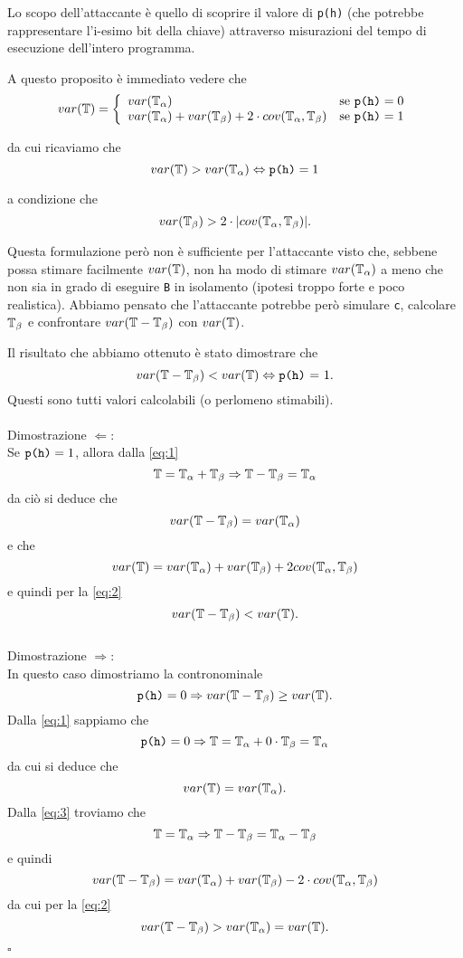 	Lo scopo dell'attaccante è quello di scoprire il valore di \texttt{p(h)} (che potrebbe rappresentare l'i-esimo bit della chiave) attraverso misurazioni del tempo di esecuzione dell'intero programma.
	
	A questo proposito è immediato vedere che $$var(\mathbb{T})=\left\{\begin{array}{ll}
	var(\mathbb{T}_{\alpha}) & \mathrm{s}\mathrm{e}\ \text{\texttt{p(h)}} = 0\\
	var(\mathbb{T}_{\alpha})+var(\mathbb{T}_{\beta})+2\cdot cov (\mathbb{T}_{\alpha},\mathbb{T}_{\beta}) & \mathrm{s}\mathrm{e}\ \text{\texttt{p(h)}} = 1
	\end{array}\right.$$ 
	
	da cui ricaviamo che $$var(\mathbb{T}) > var(\mathbb{T}_{\alpha}) \Leftrightarrow \text{\texttt{p(h)}} = 1$$ 
	
	a condizione che 
	\begin{equation} \label{eq:2}
		var(\mathbb{T}_{\beta}) > 2 \cdot |cov(\mathbb{T}_{\alpha},\mathbb{T}_{\beta})|.
	\end{equation}
		
	Questa formulazione però non è sufficiente per l'attaccante visto che, sebbene possa stimare facilmente $var(\mathbb{T})$, non ha modo di stimare $var(\mathbb{T}_{\alpha})$ a meno che non sia in grado di eseguire \texttt{B} in isolamento (ipotesi troppo forte e poco realistica). Abbiamo pensato che l'attaccante potrebbe però simulare \texttt{c}, calcolare $\mathbb{T}_{\beta}$ e confrontare $var(\mathbb{T} - \mathbb{T}_{\beta})$ con $var(\mathbb{T})$. 
	
	Il risultato che abbiamo ottenuto è stato dimostrare che $$var(\mathbb{T} - \mathbb{T}_{\beta}) < var(\mathbb{T}) \Leftrightarrow \text{\texttt{p(h)} = 1}.$$ Questi sono tutti valori calcolabili (o perlomeno stimabili).\\ \\Dimostrazione $\Leftarrow$:\\
	Se $\text{\texttt{p(h)}} = 1$, allora dalla \ref{eq:1} $$\mathbb{T} = \mathbb{T}_{\alpha} + \mathbb{T}_{\beta} \Rightarrow \mathbb{T} - \mathbb{T}_{\beta} = \mathbb{T}_{\alpha}$$
	da ciò si deduce che $$var(\mathbb{T} - \mathbb{T}_{\beta}) = var(\mathbb{T}_{\alpha})$$ 
	e che $$var(\mathbb{T}) = var(\mathbb{T}_{\alpha}) + var(\mathbb{T}_{\beta}) + 2cov(\mathbb{T}_{\alpha},\mathbb{T}_{\beta})$$
	e quindi per la \ref{eq:2} $$var(\mathbb{T} - \mathbb{T}_{\beta}) < var(\mathbb{T}).$$\\Dimostrazione $\Rightarrow$:\\
	In questo caso dimostriamo la contronominale $$\text{\texttt{p(h)}} = 0 \Rightarrow var(\mathbb{T} - \mathbb{T}_{\beta}) \geq var(\mathbb{T}).$$  
	Dalla \ref{eq:1} sappiamo che
	\begin{equation} \label{eq:3}
		\text{\texttt{p(h)}} = 0 \Rightarrow \mathbb{T} = \mathbb{T}_{\alpha} + 0\cdot \mathbb{T}_{\beta} = \mathbb{T}_{\alpha}
	\end{equation}
	da cui si deduce che $$var(\mathbb{T}) = var(\mathbb{T}_{\alpha}).$$
	Dalla \ref{eq:3} troviamo che
	$$\mathbb{T} = \mathbb{T}_{\alpha} \Rightarrow \mathbb{T} - \mathbb{T}_{\beta} = \mathbb{T}_{\alpha} - \mathbb{T}_{\beta}$$
	e quindi
	$$var(\mathbb{T} - \mathbb{T}_{\beta}) = var(\mathbb{T}_{\alpha}) + var(\mathbb{T}_{\beta}) - 2\cdot cov (\mathbb{T}_{\alpha},\mathbb{T}_{\beta})$$
	da cui per la \ref{eq:2}
	$$var(\mathbb{T} - \mathbb{T}_{\beta}) > var(\mathbb{T}_{\alpha}) = var(\mathbb{T}).$$
	\begin{flushright}
		$\square$
	\end{flushright}

